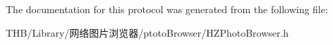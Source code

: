 The documentation for this protocol was generated from the following file\+:\begin{DoxyCompactItemize}
\item 
T\+H\+B/\+Library/网络图片浏览器/ptoto\+Browser/H\+Z\+Photo\+Browser.\+h\end{DoxyCompactItemize}
